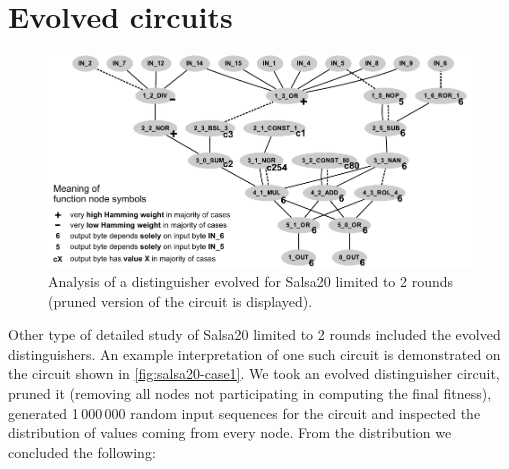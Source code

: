 \documentclass[12pt,twoside]{fithesis2}		%
\renewcommand{\_}{\leavevmode \kern0.0em\vbox{\hrule width0.4em}}
\begin{document}
\section{Evolved circuits}
\label{sec:salsa-circuits}

\begin{figure}[t!]
\centering
\includegraphics[width=\textwidth]{images/case1-final}
\caption{Analysis of a distinguisher evolved for Salsa20 limited to 2 rounds (pruned version of the circuit is displayed).}
\label{fig:salsa20-case1}
\end{figure}

Other type of detailed study of Salsa20 limited to 2 rounds included the evolved distinguishers.
An example interpretation of one such circuit is demonstrated on the circuit shown in \autoref{fig:salsa20-case1}.
We took an evolved distinguisher circuit, pruned it (removing all nodes not participating in computing the final fitness), generated
1\,000\,000 random input sequences for the circuit and inspected the distribution of values coming from every node.
From the distribution we concluded the following:
\end{document}
